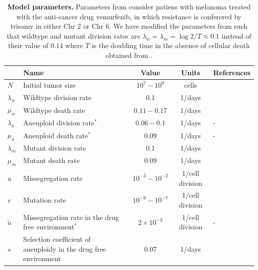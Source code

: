 \documentclass[12pt]{extarticle}
\begin{document}

\nolinenumbers
%



\clearpage

\newpage
\begin{table}
\begin{center}
  \begin{tabular}{| l |p{5cm}| c | c | p{3cm} |}
    \hline
     & Name & Value & Units & References \\ \hline
    $N$ & Initial tumor size & $10^7-10^9$ & cells  & \citet{del2009does} \\ \hline
    $\lambda_w$ & Wildtype division rate& 0.1 & 1/days  & \citet{bozic2013evolutionary,rew2000cell} \\ \hline
    $\mu_w$ & Wildtype death rate& $0.11-0.17$ & 1/days  & \citet{bozic2013evolutionary} \\ \hline
    $\lambda_a$  & Aneuploid division rate$^\ast$ & $0.06-0.1$ & 1/days  & - \\ \hline
    $\mu_a$ & Aneuploid death rate$^\ast$ & $0.09$ & 1/days  & - \\ \hline
    $\lambda_m$ & Mutant division rate& 0.1 & 1/days  & \citet{bozic2013evolutionary,rew2000cell} \\ \hline
    $\mu_m$ & Mutant death rate& 0.09 & 1/days  & \citet{bozic2013evolutionary,carlson2003tumor} \\ \hline
    $u$ & Missegregation rate& $10^{-3}-10^{-2}$ & 1$\slash$cell division  & \citet{bakker2023predicting} \\ \hline
    $v$ & Mutation rate& $10^{-9}-10^{-7}$ &  1$\slash$cell division  & \citet{bozic2013evolutionary,loeb2001mutator} \\  \hline
    $\tilde{u}$ & Missegregation rate in the drug free environment$^\ast$& $2\times10^{-3}$ & 1$\slash$cell division  & - \\ \hline
    $s$ & Selection coefficient of aneuploidy in the drug free environment& $0.07$ &  1/days   & \citet{lukow2021chromosomal} \\  
    \hline
  \end{tabular}
\caption{\textbf{Model parameters.} 
Parameters from \citet{bozic2013evolutionary} consider patiens with melanoma treated with the anti-cancer drug vemurfenib, in which resistance is conferered by trisomy in either Chr 2 or Chr 6.
We have modified the parameters from \citet{bozic2013evolutionary} such that wildtype and mutant division rates are $\lambda_{w} = \lambda_{m} = \log2/T\approx0.1$ instead of their value of $0.14$ where $T$ is the doubling time in the absence of cellular death obtained from \citet{rew2000cell}.}
  \label{table1}
\end{center}
\end{table}
\end{document}
